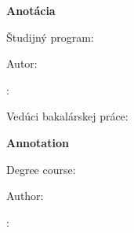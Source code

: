 \newpage
\thispagestyle{plain}

\noindent
{\huge\bf Anotácia}\\[\baselineskip]
\noindent 
\MakeUppercase{\Unisk}

\vspace*{.2cm}
\noindent
\MakeUppercase{\Facultysk}

\vspace*{.2cm}
\noindent
Študijný program: \hspace*{1.9cm} \Programsk

\vspace*{.7cm}
\noindent
Autor: \hspace*{3.9cm} \Author

\vspace*{.2cm}
\noindent
\Thesissk:\hspace*{2.2cm}\Titlesk

\vspace*{.2cm}
\noindent
Vedúci bakalárskej práce:\hspace*{.9cm}\Supervisor

\vspace*{.2cm}
\noindent
\Monthsk \Year
\noindent

\vspace*{2cm}
\noindent
\lipsum[1]
\newpage\null\thispagestyle{empty}\newpage


\thispagestyle{plain}

\noindent
{\huge \bf Annotation}\\[\baselineskip]
\noindent
\noindent 
\MakeUppercase{\Uni}

\vspace*{.2cm}
\noindent
\MakeUppercase{\Faculty}

\vspace*{.2cm}
\noindent
Degree course: \hspace*{2.5cm} \Program

\vspace*{.7cm}
\noindent
Author: \hspace*{3.8cm}\Author

\vspace*{.2cm}
\noindent
\Thesis:\hspace*{2.6cm}\Title

\vspace*{.2cm}
\noindent
\Superv\hspace*{3.3cm}\Supervisor

\vspace*{.2cm}
\noindent
\Month \Year
\noindent

\vspace*{2cm}
\noindent
\lipsum[1]